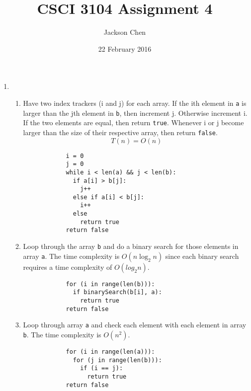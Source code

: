 \documentclass[11pt, letterpaper]{article}
\newcommand{\subtitle}[1]{
  \posttitle{
    \par\end{center}
    \begin{center}\large#1\end{center}
    \vskip0.5em}
}
\begin{document}
  \title{CSCI 3104 Assignment 4}
    \subtitle{10:00 - 10:50 Wanshan}
    \date{22 February 2016}
    \author{Jackson Chen}
    \maketitle

  \begin{enumerate}
    \item
      \begin{enumerate}
        \item
          Have two index trackers (i and j) for each array. If the ith element in \texttt{a} is larger than the jth element
          in \texttt{b}, then increment j. Otherwise increment i. If the two elements are equal, then return \texttt{true}.
          Whenever i or j become larger than the size of their respective array, then return \texttt{false}.
          \[ T(n) = O(n) \]

          \begin{lstlisting}
            i = 0
            j = 0
            while i < len(a) && j < len(b):
              if a[i] > b[j]:
                j++
              else if a[i] < b[j]:
                i++
              else
                return true
            return false
          \end{lstlisting}

        \item
          Loop through the array \texttt{b} and do a binary search for those elements in array \texttt{a}. The time complexity is
          $O(n\log _{2}n)$ since each binary search requires a time complexity of $O(log_{2}n)$.

          \begin{lstlisting}
            for (i in range(len(b))):
              if binarySearch(b[i], a):
                return true
            return false
          \end{lstlisting}

        \item
          Loop through array \texttt{a} and check each element with each element in array \texttt{b}. The time complexity is $O(n^2)$.

          \begin{lstlisting}
            for (i in range(len(a))):
              for (j in range(len(b))):
                if (i == j):
                  return true
            return false
          \end{lstlisting}


\end{enumerate}
\end{enumerate}
\end{document}
